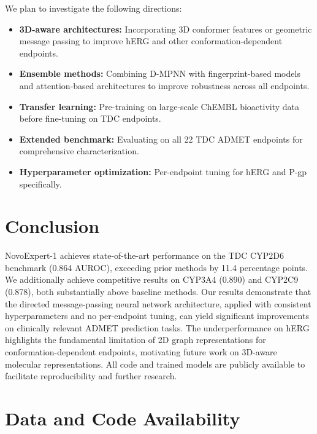 \documentclass[11pt]{article}
\begin{document}
We plan to investigate the following directions:

\begin{itemize}
    \item \textbf{3D-aware architectures:} Incorporating 3D conformer features or geometric message passing to improve hERG and other conformation-dependent endpoints.
    \item \textbf{Ensemble methods:} Combining D-MPNN with fingerprint-based models and attention-based architectures to improve robustness across all endpoints.
    \item \textbf{Transfer learning:} Pre-training on large-scale ChEMBL bioactivity data before fine-tuning on TDC endpoints.
    \item \textbf{Extended benchmark:} Evaluating on all 22 TDC ADMET endpoints for comprehensive characterization.
    \item \textbf{Hyperparameter optimization:} Per-endpoint tuning for hERG and P-gp specifically.
\end{itemize}

\section{Conclusion}

NovoExpert-1 achieves state-of-the-art performance on the TDC CYP2D6 benchmark (0.864 AUROC), exceeding prior methods by 11.4 percentage points. We additionally achieve competitive results on CYP3A4 (0.890) and CYP2C9 (0.878), both substantially above baseline methods. Our results demonstrate that the directed message-passing neural network architecture, applied with consistent hyperparameters and no per-endpoint tuning, can yield significant improvements on clinically relevant ADMET prediction tasks. The underperformance on hERG highlights the fundamental limitation of 2D graph representations for conformation-dependent endpoints, motivating future work on 3D-aware molecular representations. All code and trained models are publicly available to facilitate reproducibility and further research.

\section*{Data and Code Availability}
\end{document}
